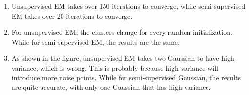 \begin{answer}
    \begin{enumerate}
\item Unsupervised EM takes over 150 iterations to converge, while semi-supervised EM takes over 20 iterations to converge.
\item For unsupervised EM, the clusters change for every random initialization. While for semi-supervised EM, the results are the same.
\item As shown in the figure, unsupervised EM takes two Gaussian to have high-variance, which is wrong. This is probably because high-variance will introduce more noise points. While for semi-supervised Gaussian, the results are quite accurate, with only one Gaussian that has high-variance.
    \end{enumerate}
 \end{answer}
